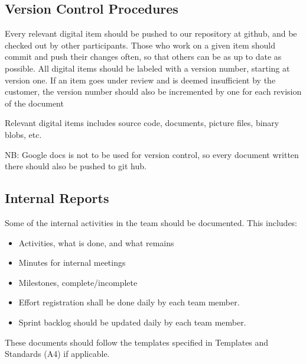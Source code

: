 \subsection{Version Control Procedures}
Every relevant digital item should be pushed to our \gls{repository} at github, and be checked out by other participants. Those who work on a given item should commit and push their changes often, so that others can be as up to date as possible. All digital items should be labeled with a version number, starting at version one. If an item goes under review and is deemed insufficient by the customer, the version number should also be incremented by one for each revision of the document

Relevant digital items includes source code, documents, picture files, binary blobs, etc.

NB: Google docs is not to be used for version control, so every document written there should also be pushed to git hub.

\subsection{Internal Reports}
Some of the internal activities in the team should be documented. This includes:
\begin{itemize}
	\item Activities, what is done, and what remains
	\item Minutes for internal meetings
	\item Milestones, complete/incomplete
	\item Effort registration shall be done daily by each team member.
	\item Sprint backlog should be updated daily by each team member.
\end{itemize}
These documents should follow the templates specified in Templates and Standards (A4) if applicable.


